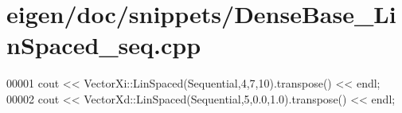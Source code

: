 \hypertarget{eigen_2doc_2snippets_2_dense_base___lin_spaced__seq_8cpp_source}{}\section{eigen/doc/snippets/\+Dense\+Base\+\_\+\+Lin\+Spaced\+\_\+seq.cpp}
\label{eigen_2doc_2snippets_2_dense_base___lin_spaced__seq_8cpp_source}

\begin{DoxyCode}
00001 cout << VectorXi::LinSpaced(Sequential,4,7,10).transpose() << endl;
00002 cout << VectorXd::LinSpaced(Sequential,5,0.0,1.0).transpose() << endl;
\end{DoxyCode}
